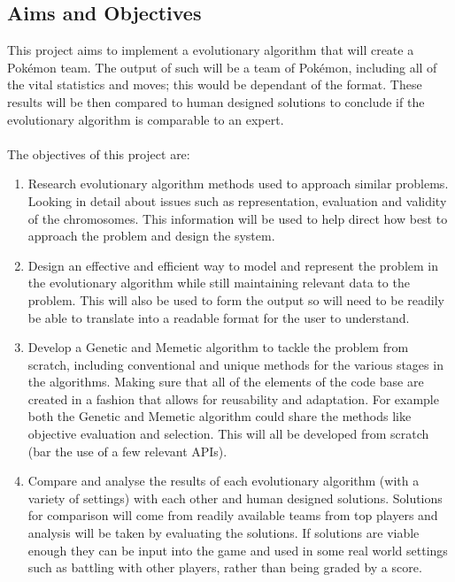 \documentclass[a4paper]{article}
\newcommand{\Pokemon}{Pok\'{e}mon}
\begin{document}
\subsection{Aims and Objectives}
\par
This project aims to implement a evolutionary algorithm that will create a \Pokemon{} team.
The output of such will be a team of \Pokemon{}, including all of the vital statistics and moves; this would be dependant of the format.
These results will be then compared to human designed solutions to conclude if the evolutionary algorithm is comparable to an expert.
\\ \\The objectives of this project are:
\begin{enumerate}
    \item Research evolutionary algorithm methods used to approach similar problems.
    Looking in detail about issues such as representation, evaluation and validity of the chromosomes.
    This information will be used to help direct how best to approach the problem and design the system.
    \item Design an effective and efficient way to model and represent the problem in the evolutionary algorithm while still maintaining relevant data to the problem.
    This will also be used to form the output so will need to be readily be able to translate into a readable format for the user to understand.
    \item Develop a Genetic and Memetic algorithm to tackle the problem from scratch, including conventional and unique methods for the various stages in the algorithms.
    Making sure that all of the elements of the code base are created in a fashion that allows for reusability and adaptation.
    For example both the Genetic and Memetic algorithm could share the methods like objective evaluation and selection.
    This will all be developed from scratch (bar the use of a few relevant APIs).
    \item Compare and analyse the results of each evolutionary algorithm (with a variety of settings) with each other and human designed solutions.
    Solutions for comparison will come from readily available teams from top players and analysis will be taken by evaluating the solutions.
    If solutions are viable enough they can be input into the game and used in some real world settings such as battling with other players, rather than being graded by a score.
\end{enumerate}
\end{document}

